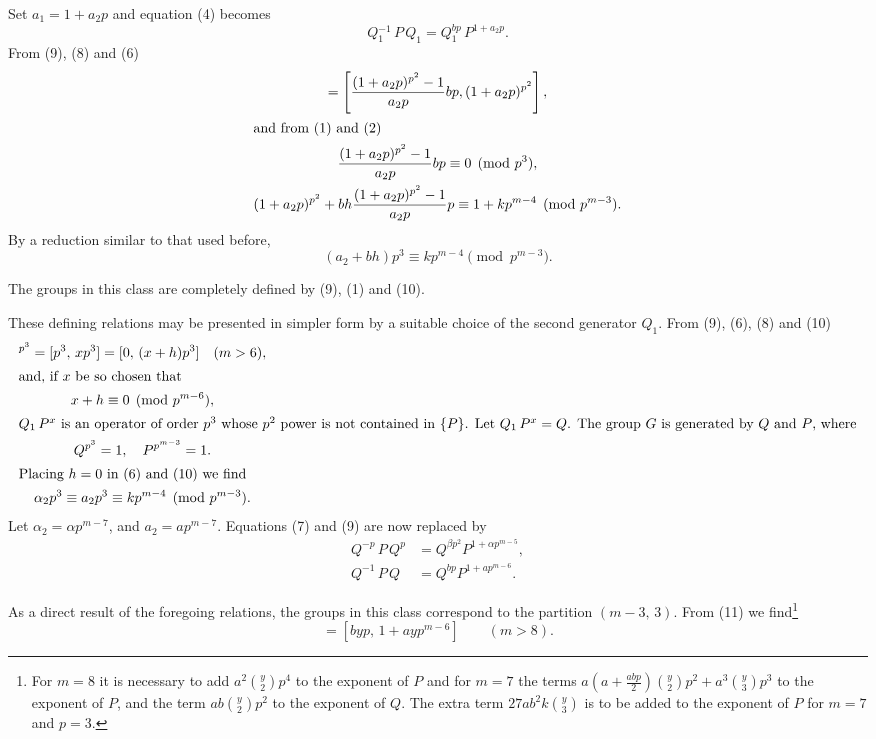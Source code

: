 \documentclass[oneside]{article}
\begin{document}
Set $a_1 = 1 + a_2 p$ and equation (4) becomes
\begin{equation}
Q{}_1^{-1}\, P\, Q_1 = Q{}_1^{bp}\, P^{1 + a_2 p}. %
\end{equation}
\noindent From (9), (8) and (6)
\begin{gather*}
[-p^2,\, 1,\, p^2] = \left[\frac{(1 + a_2 p)^{p^2}-1}{a_2 p}bp,
  (1 + a_2 p)^{p^2}\right], \\
\intertext{and from (1) and (2)}
\frac{(1 + a_2 p)^{p^2} - 1}{a_2 p}bp \equiv 0 \pmod{p^3}, \\
(1 + a_2 p)^{p^2} + bh\frac{(1 + a_2 p)^{p^2} - 1}{a_2 p}p
  \equiv 1 + kp^{m-4} \pmod{p^{m-3}}.
\end{gather*}
\noindent By a reduction similar to that used before,
\begin{equation}
(a_2 + bh)p^3 \equiv kp^{m-4} \pmod{p^{m-3}}. %
\end{equation}

The groups in this class are completely defined by (9), (1) and (10).

These defining relations may be presented in simpler form by a suitable
choice of the second generator $Q_1$. From (9), (6), (8) and (10)
\begin{gather*}
[1,\, x]^{p^3} = [p^3,\, xp^3] = [0,\, (x + h)p^3] \quad (m > 6), \\
\intertext{and, if $x$ be so chosen that}
x + h \equiv 0 \pmod{p^{m-6}}, \\
\intertext{$Q_1\, P^x$ is an operator of order $p^3$ whose $p^2$
power is not contained in $\{P\}$. Let $Q_1\, P^x = Q$. The group
$G$ is generated by $Q$ and $P$, where}
Q^{p^3} = 1, \quad P^{p^{m-3}} = 1. \\
\intertext{Placing $h = 0$ in (6) and (10) we find}
\alpha_2 p^3 \equiv a_2 p^3 \equiv k p^{m-4} \pmod{p^{m-3}}.
\end{gather*}
\noindent Let $\alpha_2 = \alpha p^{m-7}$, and $a_2 = ap^{m-7}$.
Equations (7) and (9) are now replaced by
\begin{equation}
\left.
  \begin{aligned}
  Q^{-p}\, P\, Q^p &= Q^{\beta p^2} P^{1 + \alpha p^{m-5}},\\
  Q^{-1}\, P\, Q   &= Q^{bp} P^{1 + ap^{m-6}}.
  \end{aligned}
\right. %
\end{equation}

As a direct result of the foregoing relations, the groups in this
class correspond to the partition $(m-3,\, 3)$. From (11) we
find\footnote{For $m = 8$ it is necessary to add
$a^2\binom{y}{2}p^4$ to the exponent of $P$ and for $m = 7$ the
terms $a(a + \frac{abp}{2})\binom{y}{2}p^2 + a^3\binom{y}{3}p^3$
to the exponent of $P$, and the term $ab\binom{y}{2}p^2$ to the
exponent of $Q$. The extra term $27ab^2 k\binom{y}{3}$ is to be
added to the exponent of $P$ for $m = 7$ and $p = 3$.}
\begin{equation*}
[-y,\, 1,\, y] = [byp,\, 1 + ayp^{m-6}] \qquad (m > 8).
\end{equation*}
\end{document}
